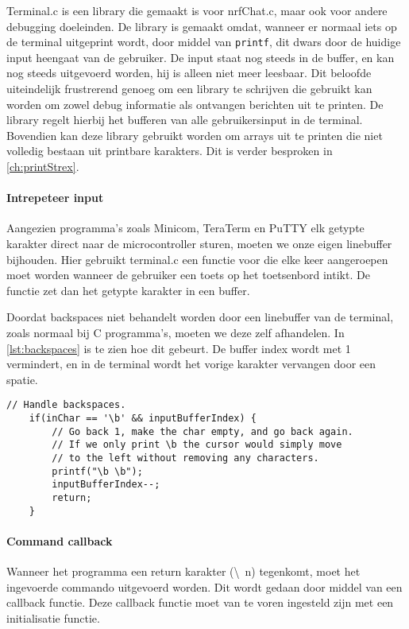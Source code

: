 
Terminal.c is een library die gemaakt is voor nrfChat.c, maar ook voor andere debugging doeleinden. De library is gemaakt omdat, wanneer er normaal iets op de terminal uitgeprint wordt, door middel van \texttt{printf}, dit dwars door de huidige input heengaat van de gebruiker. De input staat nog steeds in de buffer, en kan nog steeds uitgevoerd worden, hij is alleen niet meer leesbaar. Dit beloofde uiteindelijk frustrerend genoeg om een library te schrijven die gebruikt kan worden om zowel debug informatie als ontvangen berichten uit te printen. De library regelt hierbij het bufferen van alle gebruikersinput in de terminal. Bovendien kan deze library gebruikt worden om arrays uit te printen die niet volledig bestaan uit printbare karakters. Dit is verder besproken in \autoref{ch:printStrex}.

\paragraph{Intrepeteer input}
Aangezien programma's zoals Minicom, TeraTerm en PuTTY elk getypte karakter direct naar de microcontroller sturen, moeten we onze eigen linebuffer bijhouden. Hier gebruikt terminal.c een functie voor die elke keer aangeroepen moet worden wanneer de gebruiker een toets op het toetsenbord intikt. De functie zet dan het getypte karakter in een buffer. 

Doordat backspaces niet behandelt worden door een linebuffer van de terminal, zoals normaal bij C programma's, moeten we deze zelf afhandelen. In \autoref{lst:backspaces} is te zien hoe dit gebeurt. De buffer index wordt met 1 vermindert, en in de terminal wordt het vorige karakter vervangen door een spatie.



\begin{lstlisting}[caption={Backspaces afhandelen},captionpos=b,label={lst:backspaces},style=c,xleftmargin=.\textwidth,xrightmargin=.\textwidth]
    // Handle backspaces.
    if(inChar == '\b' && inputBufferIndex) {
        // Go back 1, make the char empty, and go back again.
        // If we only print \b the cursor would simply move
        // to the left without removing any characters.
        printf("\b \b");
        inputBufferIndex--;
        return;
    }
\end{lstlisting}

\paragraph{Command callback}
Wanneer het programma een return karakter (\textbackslash~n) tegenkomt, moet het ingevoerde commando uitgevoerd worden. Dit wordt gedaan door middel van een callback functie. Deze callback functie moet van te voren ingesteld zijn met een initialisatie functie.

